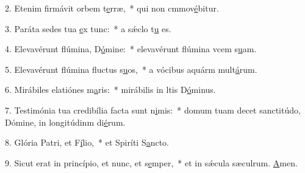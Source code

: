 2. Etenim firmávit orbem t\uline{e}rræ,~* qui non cmmov\uline{é}bitur.\par 
3. Paráta sedes tua \uline{e}x tunc:~* a sǽclo t\uline{u} es.\par 
4. Elevavérunt flúmina, D\uline{ó}mine:~* elevavérunt flúmina vcem s\uline{u}am.\par 
5. Elevavérunt flúmina fluctus s\uline{u}os,~* a vócibus aquárm mult\uline{á}rum.\par 
6. Mirábiles elatiónes m\uline{a}ris:~* mirábilis in ltis D\uline{ó}minus.\par 
7. Testimónia tua credibília facta sunt n\uline{i}mis:~* domum tuam decet sanctitúdo, Dómine, in longitúdinm di\uline{é}rum.\par 
8. Glória Patri, et F\uline{í}lio,~* et Spiríti S\uline{a}ncto.\par 
9. Sicut erat in princípio, et nunc, et s\uline{e}mper,~* et in sǽcula sæculrum. \uline{A}men.\par 
